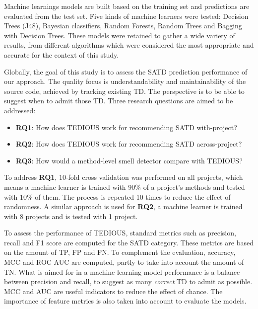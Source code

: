 Machine learnings models are built based on the training set and predictions are evaluated from the test set. Five kinds of machine learners were tested: Decision Trees (J48), Bayesian classifiers, Random Forests, Random Trees and Bagging with Decision Trees. These models were retained to gather a wide variety of results, from different algorithms which were considered the most appropriate and accurate for the context of this study. \par

Globally, the goal of this study is to assess the \ac{SATD} prediction performance of our approach. The quality focus is understandability and maintainability of the source code, achieved by tracking existing \ac{TD}. The perspective is to be able to suggest when to admit those \ac{TD}. Three research questions are aimed to be addressed: 

\begin{itemize}
\item \textbf{RQ1}: How does \ac{TEDIOUS} work for recommending \ac{SATD} with-project?
\item \textbf{RQ2}: How does \ac{TEDIOUS} work for recommending \ac{SATD} across-project?
\item \textbf{RQ3}: How would a method-level smell detector compare with \ac{TEDIOUS}?
\end{itemize}

To address \textbf{RQ1}, 10-fold cross validation was performed on all projects, which means a machine learner is trained with 90\% of a project's methods and tested with 10\% of them. The process is repeated 10 times to reduce the effect of randomness. A similar approach is used for \textbf{RQ2}, a machine learner is trained with 8 projects and is tested with 1 project. \par

To assess the performance of \ac{TEDIOUS}, standard metrics such as precision, recall and F1 score are computed for the \ac{SATD} category. These metrics are based on the amount of \ac{TP}, \ac{FP} and \ac{FN}. To complement the evaluation, accuracy, \ac{MCC} and \ac{ROC} \ac{AUC} are computed, partly to take into account the amount of \ac{TN}. What is aimed for in a machine learning model performance is a balance between precision and recall, to suggest as many \emph{correct} \ac{TD} to admit as possible. \ac{MCC} and \ac{AUC} are useful indicators to reduce the effect of chance. The importance of feature metrics is also taken into account to evaluate the models. \par

